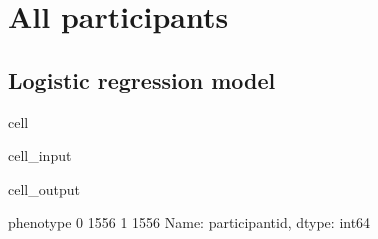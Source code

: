 \documentclass[letterpaper,10pt,english]{jupyterBook}
\begin{document}
\section{All participants}
\label{\detokenize{Cooper:all-participants}}

\subsection{Logistic regression model}
\label{\detokenize{Cooper:logistic-regression-model}}
\begin{sphinxuseclass}{cell}\begin{sphinxVerbatimInput}

\begin{sphinxuseclass}{cell_input}
\begin{sphinxVerbatim}[commandchars=\\\{\}]
 
  \PYG{p}{[}\PYG{p}{[}\PYG{p}{]}\PYG{p}{]}
  \PYG{p}{[}\PYG{p}{]}
     
\PYG{p}{[}\PYG{p}{]}
\end{sphinxVerbatim}

\end{sphinxuseclass}\end{sphinxVerbatimInput}
\begin{sphinxVerbatimOutput}

\begin{sphinxuseclass}{cell_output}
\begin{sphinxVerbatim}[commandchars=\\\{\}]
phenotype
0    1556
1    1556
Name: participant\PYGZus{}id, dtype: int64
\end{sphinxVerbatim}

\end{sphinxuseclass}\end{sphinxVerbatimOutput}

\end{sphinxuseclass}
\end{document}
